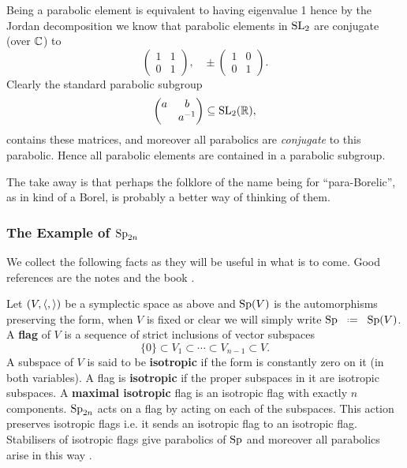 \begin{Remark}
    Being a parabolic element is equivalent to having eigenvalue 1 hence by the Jordan decomposition we know that parabolic elements in \(\operatorname{SL}_2\) are conjugate (over \(\C\)) to 
    \[\begin{pmatrix}
        1 & 1\\
        0 & 1
    \end{pmatrix},\;\;\; \pm\begin{pmatrix}
        1 & 0\\
        0 & 1
    \end{pmatrix}.\]
    Clearly the standard parabolic subgroup
    \[\begin{pmatrix}
        a & b \\
         & a\inv
    \end{pmatrix} \subseteq \SL_2(\R),\]
    contains these matrices, and moreover all parabolics are \textit{conjugate} to this parabolic. Hence all parabolic elements are contained in a parabolic subgroup. 

    The take away is that perhaps the folklore of the name being for ``para-Borelic'', as in kind of a Borel, is probably a better way of thinking of them.
\end{Remark}

\subsubsection{The Example of \(\operatorname{Sp}_{2n}\)}
We collect the following facts as they will be useful in what is to come. Good references are the notes \cite{conradStandardParabolicSubgroups} and the book \cite[\S 8]{garrettBuildingsClassicalGroups1997}. 

Let \((V, \langle ,\rangle)\) be a symplectic space as above and \(\operatorname{Sp}(V)\) is the automorphisms preserving the form, when \(V\) is fixed or clear we will simply write \(\Sp \defeq \Sp(V)\). A \textbf{flag} of \(V\) is a sequence of strict inclusions of vector subspaces 
\[\{0\}\subset V_1 \subset \cdots \subset V_{n-1} \subset V. \]
A subspace of \(V\) is said to be \textbf{isotropic} if the form is constantly zero on it (in both variables). A flag is \textbf{isotropic} if the proper subspaces in it are isotropic subspaces. A \textbf{maximal isotropic} flag is an isotropic flag with exactly \(n\) components. \(\operatorname{Sp}_{2n}\) acts on a flag by acting on each of the subspaces. This action preserves isotropic flags i.e. it sends an isotropic flag to an isotropic flag. Stabilisers of isotropic flags give parabolics of \(\operatorname{Sp}\) and moreover all parabolics arise in this way \cite[Exercise 3.2.16, 6.2.11]{springerLinearAlgebraicGroups1998}.

